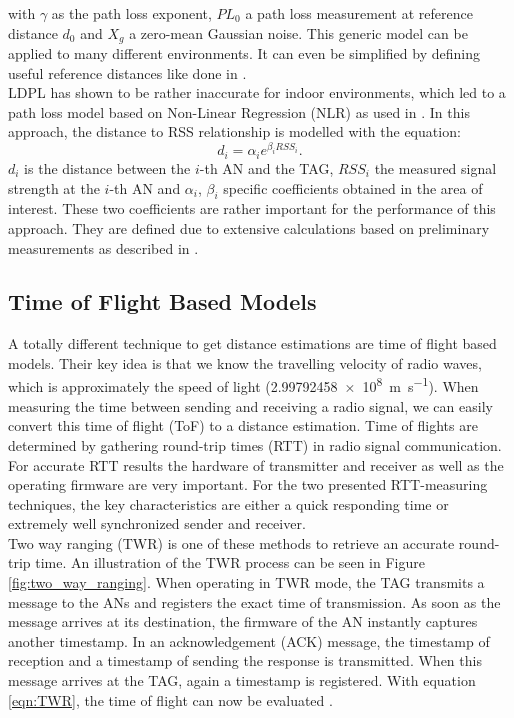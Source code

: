with $\gamma$ as the path loss exponent, $PL_{0}$ a path loss measurement at reference distance $d_0$ and $X_{g}$ a zero-mean Gaussian noise. This generic model can be applied to many different environments. It can even be simplified by defining useful reference distances like done in \cite{Kurt}.\\
\noindent\hspace*{5mm}%
LDPL has shown to be rather inaccurate for indoor environments, which led to a path loss model based on Non-Linear Regression (NLR) as used in \cite{ZanLi}. In this approach, the distance to RSS relationship is modelled with the equation:
\begin{equation}
d_{i} = \alpha_{i} e^{\beta_{i}RSS_{i}}.
\label{eqn:NLR}
\end{equation}
$d_{i}$ is the distance between the $i$-th AN and the TAG, $RSS_{i}$ the measured signal strength at the $i$-th AN and $\alpha_{i}$, $\beta_{i}$ specific coefficients obtained in the area of interest. These two coefficients are rather important for the performance of this approach. They are defined due to extensive calculations based on preliminary measurements as described in \cite{Kurt}.


\subsection{Time of Flight Based Models}
A totally different technique to get distance estimations are time of flight based models. Their key idea is that we know the travelling velocity of radio waves, which is approximately the speed of light (\SI{2.99792458e8}{\meter\per\second}). When measuring the time between sending and receiving a radio signal, we can easily convert this time of flight (ToF) to a distance estimation. Time of flights are determined by gathering round-trip times (RTT) in radio signal communication. For accurate RTT results the hardware of transmitter and receiver as well as the operating firmware are very important. For the two presented RTT-measuring techniques, the key characteristics are either a quick responding time or extremely well synchronized sender and receiver.\\
\noindent\hspace*{5mm}%
Two way ranging (TWR) is one of these methods to retrieve an accurate round-trip time. An illustration of the TWR process can be seen in Figure \ref{fig:two_way_ranging}. When operating in TWR mode, the TAG transmits a message to the ANs and registers the exact time of transmission. As soon as the message arrives at its destination, the firmware of the AN instantly captures another timestamp. In an acknowledgement (ACK) message, the timestamp of reception and a timestamp of sending the response is transmitted. When this message arrives at the TAG, again a timestamp is registered. With equation \ref{eqn:TWR}, the time of flight can now be evaluated \cite{SewioTWR}.

